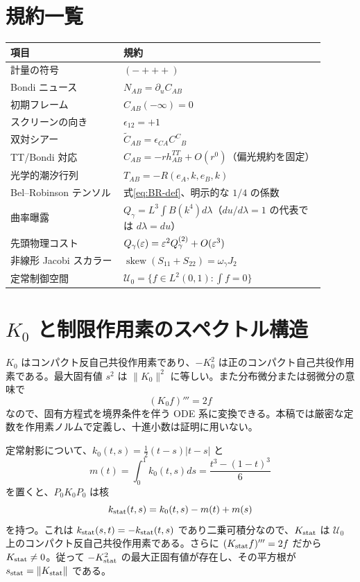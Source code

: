 \appendix
\section{規約一覧}
\begin{center}
\begin{tabular}{p{0.32\linewidth}p{0.58\linewidth}}
\toprule
項目&規約\\
\midrule
計量の符号&$(-+++)$\\
Bondi ニュース&$N_{AB}=\partial_u C_{AB}$\\
初期フレーム&$C_{AB}(-\infty)=0$\\
スクリーンの向き&$\epsilon_{12}=+1$\\
双対シアー&$\widetilde C_{AB}=\epsilon_{CA}C^C{}_B$\\
TT/Bondi 対応&$C_{AB}=-rh^{TT}_{AB}+O(r^0)$（偏光規約を固定）\\
光学的潮汐行列&$T_{AB}=-R(e_A,k,e_B,k)$\\
Bel--Robinson テンソル&式\eqref{eq:BR-def}、明示的な $1/4$ の係数\\
曲率曝露&$Q_\gamma=L^3\int B(k^4)d\lambda$（$du/d\lambda=1$ の代表では $d\lambda=du$）\\
先頭物理コスト&$Q_\gamma(\varepsilon)=\varepsilon^2Q_\gamma^{(2)}+O(\varepsilon^3)$\\
非線形 Jacobi スカラー&$\operatorname{skew}(S_{11}+S_{22})=\omega_\gamma J_2$\\
定常制御空間&$\mathcal U_0=\{f\in L^2(0,1):\int f=0\}$\\
\bottomrule
\end{tabular}
\end{center}

\section{\texorpdfstring{$K_0$ と制限作用素のスペクトル構造}{K0 と制限作用素のスペクトル構造}}
$K_0$ はコンパクト反自己共役作用素であり、$-K_0^2$ は正のコンパクト自己共役作用素である。最大固有値 $s^2$ は $\|K_0\|^2$ に等しい。また分布微分または弱微分の意味で
\[
(K_0f)'''=2f
\]
なので、固有方程式を境界条件を伴う ODE 系に変換できる。本稿では厳密な定数を作用素ノルムで定義し、十進小数は証明に用いない。

定常射影について、$k_0(t,s)=\frac12(t-s)|t-s|$ と
\[
m(t)=\int_0^1k_0(t,s)ds=\frac{t^3-(1-t)^3}{6}
\]
を置くと、$P_0K_0P_0$ は核
\begin{equation}
k_{\rm stat}(t,s)=k_0(t,s)-m(t)+m(s)
\label{eq:kstat-kernel}
\end{equation}
を持つ。これは $k_{\rm stat}(s,t)=-k_{\rm stat}(t,s)$ であり二乗可積分なので、$K_{\rm stat}$ は $\mathcal U_0$ 上のコンパクト反自己共役作用素である。さらに $(K_{\rm stat}f)'''=2f$ だから $K_{\rm stat}\neq0$。従って $-K_{\rm stat}^2$ の最大正固有値が存在し、その平方根が $s_{\rm stat}=\|K_{\rm stat}\|$ である。

